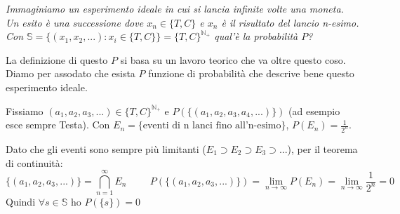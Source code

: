 \begin{Example}{}{}
    \textit{Immaginiamo un esperimento ideale in cui si lancia infinite volte una moneta. Un esito è una successione dove $x_n\in\{T,C\}$ e $x_n$ è il risultato del lancio n-esimo. Con $\mathbb{S}=\{(x_1,x_2,...):x_i\in\{T,C\}\}=\{T,C\}^{\mathbb{N}_+}$ qual'è la probabilità $P$?}

    La definizione di questo $P$ si basa su un lavoro teorico che va oltre questo coso. Diamo per assodato che esista $P$ funzione di probabilità che descrive bene questo esperimento ideale.

    Fissiamo $(a_1,a_2,a_3,...)\in\{T,C\}^{\mathbb{N}_+}$ e $P(\{(a_1,a_2,a_3,a_4,...)\})$ (ad esempio esce sempre Testa). Con $E_n=\{\mbox{eventi di n lanci fino all'n-esimo}\}$, $P(E_n)=\frac{1}{2^n}$.

    Dato che gli eventi sono sempre più limitanti ($E_1\supset E_2\supset E_3\supset...$), per il teorema di continuità:
    \begin{equation*}
        \{(a_1,a_2,a_3,...)\}=\bigcap^\infty_{n=1}E_n\hspace{1cm}P(\{(a_1,a_2,a_3,...)\})=\lim_{n\to\infty}P(E_n)=\lim_{n\to\infty}\frac{1}{2^n}=0
    \end{equation*}
    Quindi $\forall s\in\mathbb{S}$ ho $P(\{s\})=0$
\end{Example}